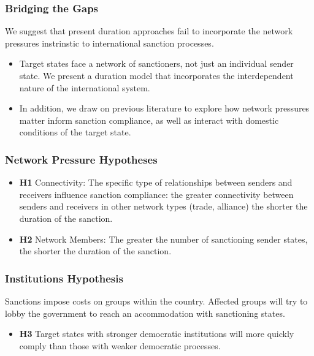 \documentclass{beamer}
\begin{document}
\begin{frame}
\frametitle{Bridging the Gaps}
We suggest that present duration approaches fail to incorporate the network pressures instrinstic to international sanction processes. 

\begin{itemize}
\item Target states face a network of sanctioners, not just an individual sender state. We present a duration model that incorporates the interdependent nature of the international system. 
\item In addition, we draw on previous literature to explore how network pressures matter inform sanction compliance, as well as interact with domestic conditions of the target state. 
\end{itemize}
\end{frame}


\begin{frame}
\frametitle{Network Pressure Hypotheses}
\begin{itemize}
		\item \textbf{H1} Connectivity: The specific type of relationships between senders and receivers influence sanction compliance: the greater connectivity between senders and receivers in other network types (trade, alliance) the shorter the duration of the sanction. 
		\item \textbf{H2} Network Members: The greater the number of sanctioning sender states, the shorter the duration of the sanction. 
\end{itemize} 
\end{frame}

\begin{frame}
\frametitle{Institutions Hypothesis}
	Sanctions impose costs on groups within the country.  Affected groups will try to lobby the government to reach an accommodation with sanctioning states. 
	\begin{itemize}
	\item \textbf{H3} Target states with stronger democratic institutions will more quickly comply than those with weaker democratic processes. 
\end{itemize}
\end{frame}
\end{document}
